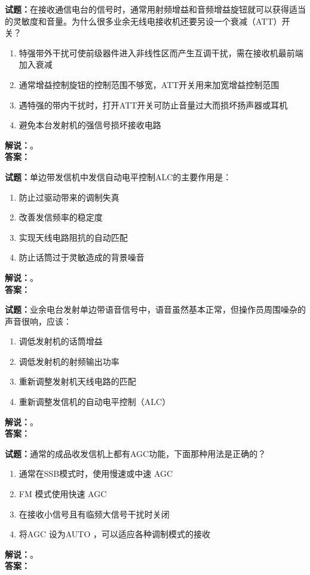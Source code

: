 \documentclass{ctexbook}
\begin{document}
\noindent\textbf{试题：}在接收通信电台的信号时，通常用射频增益和音频增益旋钮就可以获得适当的灵敏度和音量。为什么很多业余无线电接收机还要另设一个衰减（ATT）开关？
\begin{enumerate}[leftmargin=3em]
\item 特强带外干扰可使前级器件进入非线性区而产生互调干扰，需在接收机最前端加入衰减
\item 通常增益控制旋钮的控制范围不够宽，ATT开关用来加宽增益控制范围
\item 遇特强的带内干扰时，打开ATT开关可防止音量过大而损坏扬声器或耳机
\item 避免本台发射机的强信号损坏接收电路
\end{enumerate}
\noindent\textbf{解说：}\textbf{}。\\\noindent\textbf{答案：}

\bigskip




\noindent\textbf{试题：}单边带发信机中发信自动电平控制ALC的主要作用是：
\begin{enumerate}[leftmargin=3em]
\item 防止过驱动带来的调制失真
\item 改善发信频率的稳定度
\item 实现天线电路阻抗的自动匹配
\item 防止话筒过于灵敏造成的背景噪音
\end{enumerate}
\noindent\textbf{解说：}\textbf{}。\\\noindent\textbf{答案：}

\bigskip




\noindent\textbf{试题：}业余电台发射单边带语音信号中，语音虽然基本正常，但操作员周围噪杂的声音很响，应该：
\begin{enumerate}[leftmargin=3em]
\item 调低发射机的话筒增益
\item 调低发射机的射频输出功率
\item 重新调整发射机天线电路的匹配
\item 重新调整发信机的自动电平控制（ALC）
\end{enumerate}
\noindent\textbf{解说：}\textbf{}。\\\noindent\textbf{答案：}

\bigskip




\noindent\textbf{试题：}通常的成品收发信机上都有AGC功能，下面那种用法是正确的？
\begin{enumerate}[leftmargin=3em]
\item 通常在SSB模式时，使用慢速或中速 AGC
\item FM 模式使用快速 AGC
\item 在接收小信号且有临频大信号干扰时关闭
\item 将AGC 设为AUTO ，可以适应各种调制模式的接收
\end{enumerate}
\noindent\textbf{解说：}\textbf{}。\\\noindent\textbf{答案：}
\end{document}
